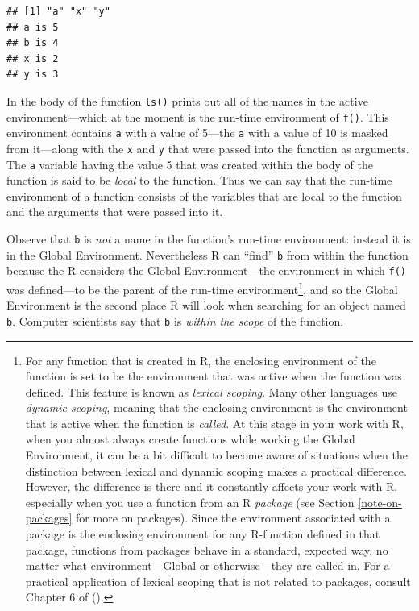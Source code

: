 \documentclass[]{book}
\let\rmarkdownfootnote\footnote%
\def\footnote{\protect\rmarkdownfootnote}
\theoremstyle{definition}
\theoremstyle{definition}
\theoremstyle{definition}
\theoremstyle{remark}
\begin{document}
{\begin{verbatim}
## [1] "a" "x" "y"
## a is 5
## b is 4
## x is 2
## y is 3
\end{verbatim}

In the body of the function \texttt{ls()} prints out all of the names in
the active environment---which at the moment is the run-time environment
of \texttt{f()}. This environment contains \texttt{a} with a value of
5---the \texttt{a} with a value of 10 is masked from it---along with the
\texttt{x} and \texttt{y} that were passed into the function as
arguments. The \texttt{a} variable having the value 5 that was created
within the body of the function is said to be \emph{local} to the
function. Thus we can say that the run-time environment of a function
consists of the variables that are local to the function and the
arguments that were passed into it.

Observe that \texttt{b} is \emph{not} a name in the function's run-time
environment: instead it is in the Global Environment. Nevertheless R can
``find'' \texttt{b} from within the function because the R considers the
Global Environment---the environment in which \texttt{f()} was
defined---to be the parent of the run-time environment\footnote{For any
  function that is created in R, the enclosing environment of the
  function is set to be the environment that was active when the
  function was defined. This feature is known as \emph{lexical scoping}.
  Many other languages use \emph{dynamic scoping}, meaning that the
  enclosing environment is the environment that is active when the
  function is \emph{called}. At this stage in your work with R, when you
  almost always create functions while working the Global Environment,
  it can be a bit difficult to become aware of situations when the
  distinction between lexical and dynamic scoping makes a practical
  difference. However, the difference is there and it constantly affects
  your work with R, especially when you use a function from an R
  \emph{package} (see Section \ref{note-on-packages} for more on
  packages). Since the environment associated with a package is the
  enclosing environment for any R-function defined in that package,
  functions from packages behave in a standard, expected way, no matter
  what environment---Global or otherwise---they are called in. For a
  practical application of lexical scoping that is not related to
  packages, consult Chapter 6 of (\citet{Grolemund2014}).}, and so the
Global Environment is the second place R will look when searching for an
object named \texttt{b}. Computer scientists say that \texttt{b} is
\emph{within the scope}  of the function.

}
\end{document}

